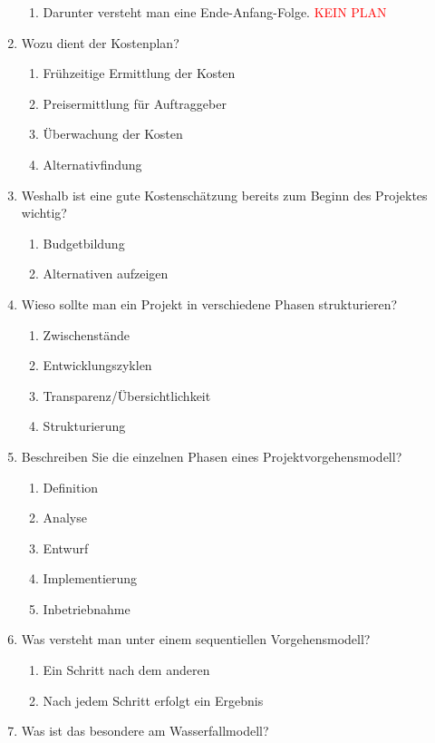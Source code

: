 \documentclass[12pt,a4paper]{article}
\begin{document}
\begin{enumerate}
\begin{enumerate}
		\item Darunter versteht man eine Ende-Anfang-Folge. \textcolor{red}{KEIN PLAN}
	\end{enumerate}
	\item Wozu dient der Kostenplan?
	\begin{enumerate}
		\item Frühzeitige Ermittlung der Kosten
		\item Preisermittlung für Auftraggeber
		\item Überwachung der Kosten
		\item Alternativfindung
	\end{enumerate}
	\item Weshalb ist eine gute Kostenschätzung bereits zum Beginn des Projektes wichtig?
	\begin{enumerate}
		\item Budgetbildung 
		\item Alternativen aufzeigen
	\end{enumerate}
	\item Wieso sollte man ein Projekt in verschiedene Phasen strukturieren?
	\begin{enumerate}
		\item Zwischenstände
		\item Entwicklungszyklen
		\item Transparenz/Übersichtlichkeit
		\item Strukturierung
	\end{enumerate}
	\item Beschreiben Sie die einzelnen Phasen eines Projektvorgehensmodell?
	\begin{enumerate}
		\item Definition
		\item Analyse
		\item Entwurf
		\item Implementierung
		\item Inbetriebnahme
	\end{enumerate}
	\item Was versteht man unter einem sequentiellen Vorgehensmodell?
	\begin{enumerate}
		\item Ein Schritt nach dem anderen
		\item Nach jedem Schritt erfolgt ein Ergebnis
	\end{enumerate}
	\item Was ist das besondere am Wasserfallmodell?
	\begin{enumerate}

\end{enumerate}
\end{enumerate}
\end{document}

